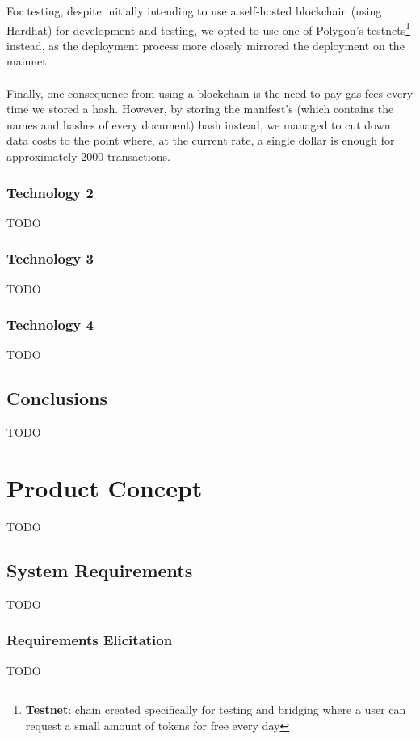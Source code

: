 \documentclass[a4paper,11pt]{article}
\begin{document}
        For testing, despite initially intending to use a self-hosted blockchain (using Hardhat) for development and testing, we opted to use one of Polygon's testnets\footnote{\textbf{Testnet}: chain created specifically for testing and bridging where a user can request a small amount of tokens for free every day} instead, as the deployment process more closely mirrored the deployment on the mainnet.

        \paragraph{} Finally, one consequence from using a blockchain is the need to pay gas fees every time we stored a hash. However, by storing the manifest's (which contains the names and hashes of every document) hash instead, we managed to cut down data costs to the point where, at the current rate, a single dollar is enough for approximately 2000 transactions.
        
        
    \subsubsection{Technology 2}
        TODO
    \subsubsection{Technology 3}
        TODO
    \subsubsection{Technology 4}
        TODO

    \vspace{0.5cm}
    \subsection{Conclusions}
        TODO

    \clearpage %
    \section{Product Concept}\label{sec:productconcept}
        TODO
        
    \vspace{0.5cm}
    \subsection{System Requirements}
        TODO
    \subsubsection{Requirements Elicitation}
        TODO
        
\end{document}
